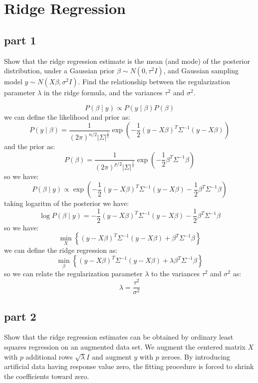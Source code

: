 \section{Ridge Regression}

\subsection{part 1}
Show that the ridge regression estimate is the mean (and mode) of the posterior distribution, under a Gaussian prior $\beta \sim N(0, \tau^2 I)$, and Gaussian sampling model $y \sim N(X\beta, \sigma^2 I)$. Find the relationship between the regularization parameter $\lambda$ in the ridge formula, and the variances $\tau^2$ and $\sigma^2$.

\begin{qsolve}
	\begin{qsolve}[]
		$$
		P(\beta \mid y ) \propto P(y \mid \beta)P(\beta)
		$$
		we can define the likelihood and prior as:
		$$
		P(y \mid \beta) = \frac{1}{(2\pi)^{n/2} |\Sigma|^{\frac{1}{2}}} \exp\left(-\frac{1}{2}(y-X\beta)^T \Sigma^{-1} (y-X\beta)\right)
		$$
		and the prior as:
		$$
		P(\beta) = \frac{1}{(2\pi)^{p/2} |\Sigma|^{\frac{1}{2}}} \exp\left(-\frac{1}{2}\beta^T \Sigma^{-1} \beta\right)
		$$
		so we have:
		$$
		P(\beta \mid y) \propto \exp\left(-\frac{1}{2}(y-X\beta)^T \Sigma^{-1} (y-X\beta) - \frac{1}{2}\beta^T \Sigma^{-1} \beta\right)
		$$
		taking logaritm of the posterior we have:
		$$
		\log P(\beta \mid y) = -\frac{1}{2}(y-X\beta)^T \Sigma^{-1} (y-X\beta) - \frac{1}{2}\beta^T \Sigma^{-1} \beta
		$$
		so we have:
		$$
		\min_{X} \left\{ (y-X\beta)^T \Sigma^{-1} (y-X\beta) + \beta^T \Sigma^{-1} \beta \right\}
		$$
		we can define the ridge regression as:
		$$
		\min_{\beta} \left\{ (y-X\beta)^T \Sigma^{-1} (y-X\beta) + \lambda \beta^T \Sigma^{-1} \beta \right\}
		$$
		so we can relate the regularization parameter $\lambda$ to the variances $\tau^2$ and $\sigma^2$ as:
		$$
		\lambda = \frac{\tau^2}{\sigma^2}
		$$
	\end{qsolve}
\end{qsolve}

\subsection{part 2}
Show that the ridge regression estimates can be obtained by ordinary least squares regression on an augmented data set. We augment the centered matrix $X$ with $p$ additional rows $\sqrt{\lambda} I$ and augment $y$ with $p$ zeroes. By introducing artificial data having response value zero, the fitting procedure is forced to shrink the coefficients toward zero.

